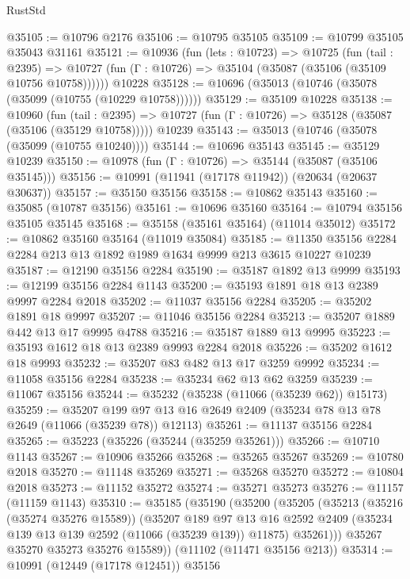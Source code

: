 \begin{lexlean}{RustStd}
\begin{coremodule}
@35105 := @10796 @2176
@35106 := @10795 @35105
@35109 := @10799 @35105 @35043 @31161
@35121 := @10936
    (fun (lets : @10723) =>
    @10725
      (fun (tail : @2395) =>
      @10727 (fun (Γ : @10726) => @35104 (@35087 (@35106 (@35109 @10756 @10758))))))
    @10228
@35128 := @10696 (@35013 (@10746 (@35078 (@35099 (@10755 (@10229 @10758))))))
@35129 := @35109 @10228
@35138 := @10960
    (fun (tail : @2395) => @10727 (fun (Γ : @10726) => @35128 (@35087 (@35106 (@35129 @10758)))))
    @10239
@35143 := @35013 (@10746 (@35078 (@35099 (@10755 @10240))))
@35144 := @10696 @35143
@35145 := @35129 @10239
@35150 := @10978 (fun (Γ : @10726) => @35144 (@35087 (@35106 @35145)))
@35156 := @10991 (@11941 (@17178 @11942)) (@20634 (@20637 @30637))
@35157 := @35150 @35156
@35158 := @10862 @35143
@35160 := @35085 (@10787 @35156)
@35161 := @10696 @35160
@35164 := @10794 @35156 @35105 @35145
@35168 := @35158 (@35161 @35164) (@11014 @35012)
@35172 := @10862 @35160 @35164 (@11019 @35084)
@35185 := @11350 @35156 @2284 @2284 @213 @13 @1892 @1989 @1634 @9999 @213 @3615 @10227 @10239
@35187 := @12190 @35156 @2284
@35190 := @35187 @1892 @13 @9999
@35193 := @12199 @35156 @2284 @1143
@35200 := @35193 @1891 @18 @13 @2389 @9997 @2284 @2018
@35202 := @11037 @35156 @2284
@35205 := @35202 @1891 @18 @9997
@35207 := @11046 @35156 @2284
@35213 := @35207 @1889 @442 @13 @17 @9995 @4788
@35216 := @35187 @1889 @13 @9995
@35223 := @35193 @1612 @18 @13 @2389 @9993 @2284 @2018
@35226 := @35202 @1612 @18 @9993
@35232 := @35207 @83 @482 @13 @17 @3259 @9992
@35234 := @11058 @35156 @2284
@35238 := @35234 @62 @13 @62 @3259
@35239 := @11067 @35156
@35244 := @35232 (@35238 (@11066 (@35239 @62)) @15173)
@35259 := @35207
    @199
    @97
    @13
    @16
    @2649
    @2409
    (@35234 @78 @13 @78 @2649 (@11066 (@35239 @78)) @12113)
@35261 := @11137 @35156 @2284
@35265 := @35223 (@35226 (@35244 (@35259 @35261)))
@35266 := @10710 @1143
@35267 := @10906 @35266
@35268 := @35265 @35267
@35269 := @10780 @2018
@35270 := @11148 @35269
@35271 := @35268 @35270
@35272 := @10804 @2018
@35273 := @11152 @35272
@35274 := @35271 @35273
@35276 := @11157 (@11159 @1143)
@35310 := @35185
    (@35190
      (@35200
        (@35205
          (@35213
            (@35216 (@35274 @35276 @15589))
            (@35207
              @189
              @97
              @13
              @16
              @2592
              @2409
              (@35234 @139 @13 @139 @2592 (@11066 (@35239 @139)) @11875)
              @35261)))
        @35267
        @35270
        @35273
        @35276
        @15589))
    (@11102 (@11471 @35156 @213))
@35314 := @10991 (@12449 (@17178 @12451)) @35156

\end{coremodule}
\end{lexlean}
